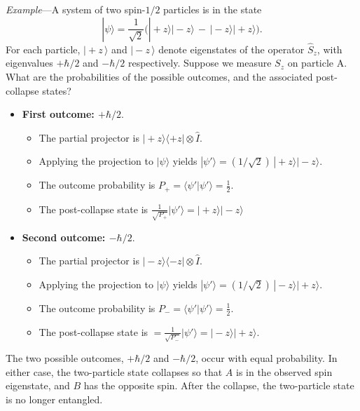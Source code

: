 \documentclass[pra,12pt]{revtex4}
\begin{document}
\begin{framed}
\noindent
\textit{Example}---A system of two spin-$1/2$ particles is in
the state
\begin{equation}
  |\psi\rangle = \frac{1}{\sqrt{2}} \Big(|\!+\!z\rangle|\!-\!z\rangle \,-\, |\!-\!z\rangle|\!+\!z\rangle\Big).
\end{equation}
For each particle, $|\!+\!z\,\rangle$ and $|\!-\!z\,\rangle$ denote
eigenstates of the operator $\hat{S}_z$, with eigenvalues $+\hbar/2$
and $-\hbar/2$ respectively.  Suppose we measure $S_z$ on particle A.
What are the probabilities of the possible outcomes, and the
associated post-collapse states?

\begin{itemize}
\item \textbf{First outcome: $+\hbar/2$}.
  \begin{itemize}
  \item The partial projector is $|\!+\!z\rangle\langle+z| \otimes \hat{I}$.
  \item Applying the projection to $|\psi\rangle$ yields
    $|\psi'\rangle = (1/\sqrt{2})\,|\!+\!z\rangle|\!-\!z\rangle$.
  \item The outcome probability is $\displaystyle
    P_+ = \langle \psi'|\psi'\rangle = \frac{1}{2}$.
  \item The post-collapse state is $\displaystyle
    \frac{1}{\sqrt{P_+}} |\psi'\rangle = |\!+\!z\rangle |\!-\!z\rangle$
  \end{itemize}

\item \textbf{Second outcome: $-\hbar/2$}.
  \begin{itemize}
  \item The partial projector is $|\!-\!z\rangle\langle-z| \otimes
    \hat{I}$.
  \item Applying the projection to $|\psi\rangle$ yields
    $|\psi'\rangle = (1/\sqrt{2})\,|\!-\!z\rangle|\!+\!z\rangle$.
  \item The outcome probability is $\displaystyle P_- = \langle \psi'|\psi'\rangle =
    \frac{1}{2}$.
  \item The post-collapse state is $\displaystyle = \frac{1}{\sqrt{P_-}} |\psi'\rangle
    = |\!-\!z\rangle |\!+\!z\rangle$.
  \end{itemize}
\end{itemize}
The two possible outcomes, $+\hbar/2$ and $-\hbar/2$, occur with equal
probability.  In either case, the two-particle state collapses so that
$A$ is in the observed spin eigenstate, and $B$ has the opposite spin.
After the collapse, the two-particle state is no longer entangled.
\end{framed}
\end{document}
